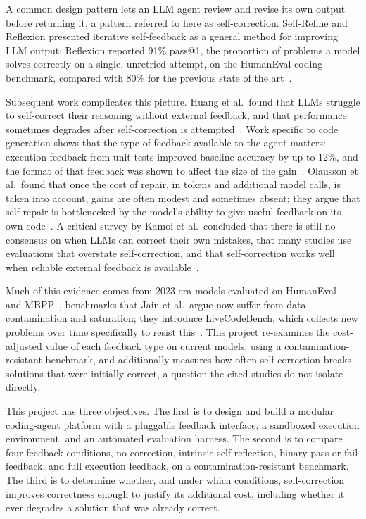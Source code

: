 \documentclass[conference]{IEEEtran}
\begin{document}
A common design pattern lets an LLM agent review and revise its own output before returning it, a pattern referred to here as self-correction. Self-Refine and Reflexion presented iterative self-feedback as a general method for improving LLM output; Reflexion reported 91\% pass@1, the proportion of problems a model solves correctly on a single, unretried attempt, on the HumanEval coding benchmark, compared with 80\% for the previous state of the art~\cite{shinn2023,madaan2023}.

Subsequent work complicates this picture. Huang et al.\ found that LLMs struggle to self-correct their reasoning without external feedback, and that performance sometimes degrades after self-correction is attempted~\cite{huang2024}. Work specific to code generation shows that the type of feedback available to the agent matters: execution feedback from unit tests improved baseline accuracy by up to 12\%, and the format of that feedback was shown to affect the size of the gain~\cite{chen2024}. Olausson et al.\ found that once the cost of repair, in tokens and additional model calls, is taken into account, gains are often modest and sometimes absent; they argue that self-repair is bottlenecked by the model's ability to give useful feedback on its own code~\cite{olausson2024}. A critical survey by Kamoi et al.\ concluded that there is still no consensus on when LLMs can correct their own mistakes, that many studies use evaluations that overstate self-correction, and that self-correction works well when reliable external feedback is available~\cite{kamoi2024}.

Much of this evidence comes from 2023-era models evaluated on HumanEval~\cite{chen2021} and MBPP~\cite{austin2021}, benchmarks that Jain et al.\ argue now suffer from data contamination and saturation; they introduce LiveCodeBench, which collects new problems over time specifically to resist this~\cite{jain2025}. This project re-examines the cost-adjusted value of each feedback type on current models, using a contamination-resistant benchmark, and additionally measures how often self-correction breaks solutions that were initially correct, a question the cited studies do not isolate directly.

This project has three objectives. The first is to design and build a modular coding-agent platform with a pluggable feedback interface, a sandboxed execution environment, and an automated evaluation harness. The second is to compare four feedback conditions, no correction, intrinsic self-reflection, binary pass-or-fail feedback, and full execution feedback, on a contamination-resistant benchmark. The third is to determine whether, and under which conditions, self-correction improves correctness enough to justify its additional cost, including whether it ever degrades a solution that was already correct.
\end{document}
